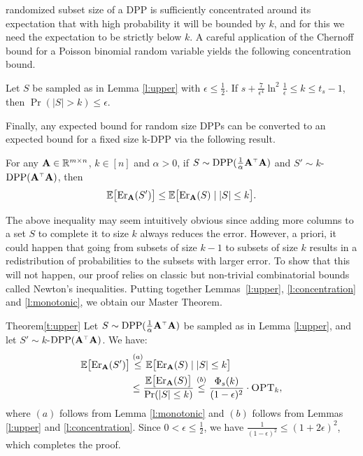 \documentclass{article}
\begin{document}
randomized subset size of a DPP is sufficiently concentrated around
its expectation that with high probability it will be bounded by $k$,
and for this we need the expectation to be strictly below $k$. A
careful application of the Chernoff bound for a Poisson binomial
random variable yields the following concentration bound.
\begin{lemma}\label{l:concentration}
Let $S$ be sampled as in Lemma \ref{l:upper} with $\epsilon\leq \frac12$.
If $s+\frac7{\epsilon^4}\ln^2\!\frac1\epsilon \leq k\leq t_s-1$, then
$\Pr(|S|>k) \leq \epsilon$.
\end{lemma}
Finally, any expected bound for random size DPPs can be converted to
an expected bound for a fixed size k-DPP via the following
result.
\begin{lemma}\label{l:monotonic}
  For any $\mathbf A\in\mathbb R^{m\times n}$, $k\in[n]$ and $\alpha>0$, if
  $S\sim\DPP(\frac1\alpha\A^\top\A)$ and $S'\sim k$-$\DPP(\A^\top\A)$, then
  \begin{align*}
    \mathbb E\big[\mathrm{Er}_\mathbf A(S')\big] \leq \mathbb E\big[\mathrm{Er}_\mathbf A(S)\mid |S|\leq k\big].
  \end{align*}
\end{lemma}
The above inequality may seem intuitively obvious since adding more columns
to a set $S$ to complete it to size $k$ always reduces the
error. However, a priori, it could happen that going from subsets 
of size $k-1$ to subsets of size $k$ results in a redistribution of
probabilities to the subsets with larger error. To show that this will
not happen, our proof relies on classic but non-trivial combinatorial
bounds called Newton's inequalities. Putting together
Lemmas~\ref{l:upper}, \ref{l:concentration} and
\ref{l:monotonic}, we obtain our Master Theorem.
\begin{proofof}{Theorem}{\ref{t:upper}}
Let $S\sim\DPP(\frac1\alpha\A^\top\A)$ be sampled as in Lemma
\ref{l:upper}, and let $S'\sim k$-$\DPP(\A^\top\A)$. We have:\vspace{-2mm}
\begin{align*}
  \mathbb E\big[\mathrm{Er}_\mathbf A(S')\big]
  &\overset{(a)}{\leq} \mathbb E\big[\mathrm{Er}_\mathbf A(S)\mid|S|\leq k\big]\\
  &\leq \frac{\mathbb E\big[\mathrm{Er}_\mathbf A(S)\big]}{\mathrm{Pr}(|S|\leq k)}
  \overset{(b)}{\leq} \frac{\Phi_s(k)}{(1-\epsilon)^2}\cdot{\textsc{OPT}_k},
\end{align*}
where $(a)$ follows from Lemma \ref{l:monotonic} and $(b)$ follows
from Lemmas \ref{l:upper} and \ref{l:concentration}. Since
$0<\epsilon\leq\frac12$, we have
$\frac1{(1-\epsilon)^2}\leq(1+2\epsilon)^2$, which completes the proof.
\end{proofof}
\end{document}
